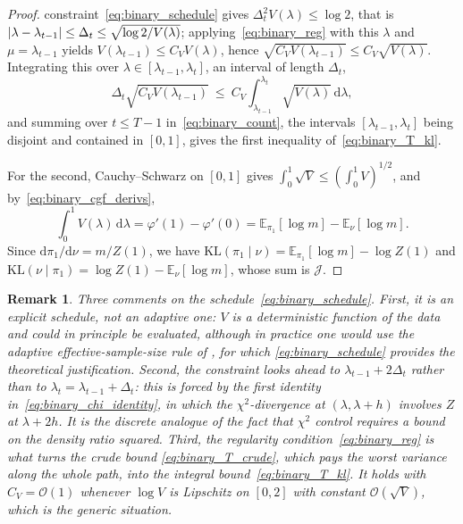 \documentclass[aos]{imsart}%
\DeclarePairedDelimiter{\abs}{\lvert}{\rvert}
\newcommand{\dd}[0]{\mathrm{d}}
\newcommand{\bbE}[0]{\mathbb{E}}
\newcommand{\OO}{\mathcal{O}}  %
\newcommand{\KL}{\mathrm{KL}}
\theoremstyle{plain}
\newtheorem{remark}{Remark}[section]
\theoremstyle{definition}
\begin{document}
\begin{proof}
        constraint~\eqref{eq:binary_schedule} gives
        $\Delta_t^{2}V(\lambda)\leq\log2$, that is
        $\abs{\lambda-\lambda_{t-1}}\leq\Delta_t\leq\sqrt{\log2/V(\lambda)}$;
        applying~\eqref{eq:binary_reg} with this $\lambda$ and
        $\mu=\lambda_{t-1}$ yields $V(\lambda_{t-1})\leq C_VV(\lambda)$, hence
        $\sqrt{C_VV(\lambda_{t-1})}\leq C_V\sqrt{V(\lambda)}$. Integrating this
        over $\lambda\in[\lambda_{t-1},\lambda_t]$, an interval of length
        $\Delta_t$,
        \begin{equation*}
            \Delta_t\sqrt{C_VV(\lambda_{t-1})}
            \ \leq\ C_V\int_{\lambda_{t-1}}^{\lambda_t}
            \sqrt{V(\lambda)}\,\dd\lambda ,
        \end{equation*}
        and summing over $t\leq T-1$ in~\eqref{eq:binary_count}, the intervals
        $[\lambda_{t-1},\lambda_t]$ being disjoint and contained in $[0,1]$,
        gives the first inequality of~\eqref{eq:binary_T_kl}.

        For the second, Cauchy--Schwarz on $[0,1]$ gives
        $\int_0^{1}\sqrt V\leq(\int_0^{1}V)^{1/2}$, and
        by~\eqref{eq:binary_cgf_derivs},
        \begin{equation*}
            \int_0^{1}V(\lambda)\,\dd\lambda=\varphi'(1)-\varphi'(0)
            =\bbE_{\pi_1}[\log m]-\bbE_{\nu}[\log m].
        \end{equation*}
        Since $\dd\pi_1/\dd\nu=m/Z(1)$, we have
        $\KL(\pi_1\mid\nu)=\bbE_{\pi_1}[\log m]-\log Z(1)$ and
        $\KL(\nu\mid\pi_1)=\log Z(1)-\bbE_{\nu}[\log m]$, whose sum is
        $\mathcal J$.
    \end{proof}

    \begin{remark}
        \label{rem:binary_schedule}
        Three comments on the schedule~\eqref{eq:binary_schedule}. First, it is
        an \emph{explicit} schedule, not an adaptive one: $V$ is a
        deterministic function of the data and could in principle be evaluated,
        although in practice one would use the adaptive
        effective-sample-size rule of \citet{Schafer2013-yq}, for which
        \eqref{eq:binary_schedule} provides the theoretical justification.
        Second, the constraint looks ahead to $\lambda_{t-1}+2\Delta_t$ rather
        than to $\lambda_t=\lambda_{t-1}+\Delta_t$: this is forced by the
        first identity in~\eqref{eq:binary_chi_identity}, in which the
        $\chi^{2}$-divergence at $(\lambda,\lambda+h)$ involves $Z$ at
        $\lambda+2h$. It is the discrete analogue of the fact that
        $\chi^{2}$ control requires a bound on the density ratio squared.
        Third, the regularity
        condition~\eqref{eq:binary_reg} is what turns the crude bound
        \eqref{eq:binary_T_crude}, which pays the worst variance along the
        whole path, into the integral bound~\eqref{eq:binary_T_kl}. It holds
        with $C_V=\OO(1)$ whenever $\log V$ is Lipschitz on $[0,2]$ with
        constant $\OO(\sqrt{V})$, which is the generic situation.
    \end{remark}
\end{document}

